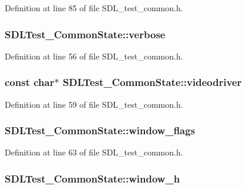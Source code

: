 Definition at line 85 of file S\-D\-L\-\_\-test\-\_\-common.\-h.

\hypertarget{struct_s_d_l_test___common_state_aad4b8ebf6277cd9d3608d2e1b48e4678}{
\subsubsection[{verbose}]{ S\-D\-L\-Test\-\_\-\-Common\-State\-::verbose}}\label{struct_s_d_l_test___common_state_aad4b8ebf6277cd9d3608d2e1b48e4678}


Definition at line 56 of file S\-D\-L\-\_\-test\-\_\-common.\-h.

\hypertarget{struct_s_d_l_test___common_state_ab3face917946465c60dc0f38f179534d}{
\subsubsection[{videodriver}]{\setlength{\rightskip}{0pt plus 5cm}const char$\ast$ S\-D\-L\-Test\-\_\-\-Common\-State\-::videodriver}}\label{struct_s_d_l_test___common_state_ab3face917946465c60dc0f38f179534d}


Definition at line 59 of file S\-D\-L\-\_\-test\-\_\-common.\-h.

\hypertarget{struct_s_d_l_test___common_state_a9e38339b34b483087ff8d52d44a80809}{
\subsubsection[{window\-\_\-flags}]{ S\-D\-L\-Test\-\_\-\-Common\-State\-::window\-\_\-flags}}\label{struct_s_d_l_test___common_state_a9e38339b34b483087ff8d52d44a80809}


Definition at line 63 of file S\-D\-L\-\_\-test\-\_\-common.\-h.

\hypertarget{struct_s_d_l_test___common_state_a9357085bdb80f4d9452b73d8f5cebc47}{
\subsubsection[{window\-\_\-h}]{ S\-D\-L\-Test\-\_\-\-Common\-State\-::window\-\_\-h}}\label{struct_s_d_l_test___common_state_a9357085bdb80f4d9452b73d8f5cebc47}


